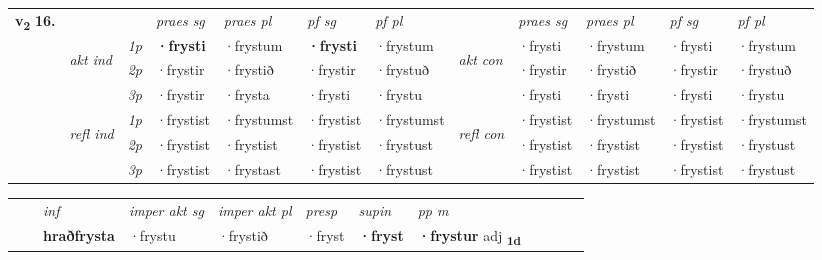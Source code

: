 \begin{tabular}{llllllllllll} \toprule
\multirow{4}{*}{{{\textbf{v{\textsubscript{2}}} \Large{\textbf{16.}}}}}  & &   &  \textit{praes sg}  & \textit{praes pl}  &\textit{ pf sg} & \textit{pf pl} &  &  \textit{praes sg}  & \textit{praes pl}  & \textit{pf sg} & \textit{pf pl } \\*
	\cmidrule{4-7} \cmidrule{9-12}
 & \multirow{3}{*}{\begin{turn}{90}\textit{akt ind}\end{turn}} & {\textit{1p}} & \textbf{·frysti} & ·frystum    & \textbf{·frysti} & ·frystum & \multirow{3}{*}{\begin{turn}{90}\textit{akt con}\end{turn}} &·frysti & ·frystum & ·frysti & ·frystum\\*
& &  {\textit{2p}} &  ·frystir  & ·frystið   & ·frystir & ·frystuð & & ·frystir & ·frystið & ·frystir & ·frystuð \\*
& &  {\textit{3p}} & ·frystir & ·frysta   & ·frysti & ·frystu & & ·frysti & ·frysti& ·frysti & ·frystu  \\*
\cmidrule{4-7} \cmidrule{9-12}
 &\multirow{3}{*}{\begin{turn}{90}\textit{refl ind}\end{turn}} & {\textit{1p}} & ·frystist & ·frystumst    & ·frystist & ·frystumst & \multirow{3}{*}{\begin{turn}{90}\textit{refl con}\end{turn}}  &·frystist & ·frystumst & ·frystist & ·frystumst\\*
 &&  {\textit{2p}} &  ·frystist  & ·frystist   & ·frystist & ·frystust & &·frystist & ·frystist & ·frystist & ·frystust \\*
& &  {\textit{3p}} & ·frystist & ·frystast   & ·frystist & ·frystust & & ·frystist & ·frystist& ·frystist & ·frystust  \\*
\cmidrule{4-7} \cmidrule{9-12}
\end{tabular}


\begin{tabular}{llllllllllll}
 & & \textit{inf} & \textit{imper akt sg} & \textit{imper akt pl}   & \textit{presp} & \textit{supin}  & \textit{pp m}     \\*
  & & \textbf{hraðfrysta} & ·frystu  & ·frystið   & ·fryst &  \textbf{·fryst}  & \textbf{·frystur} adj \textbf{\textsubscript{1d}} \\*
\cmidrule{1-12}
\end{tabular}



